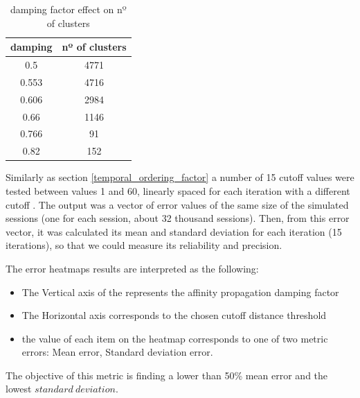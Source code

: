 \documentclass[ecp,tc,english]{iiufrgs}
\begin{document}
        \begin{table}[H]
            \centering
            \begin{small}
                \begin{tabular}{ |c|c| } 
                    \hline
                    damping & nº of clusters \\
                    \hline 
                    0.5 & 4771 \\ 
                    0.553 & 4716 \\ 
                    0.606 & 2984 \\
                    0.66 & 1146 \\
                    0.766 & 91 \\
                    0.82 & 152 \\
                    \hline
                \end{tabular}
                \end{small}
            \caption{damping factor effect on nº of clusters}
            \label{tab:damping_factor}
        \end{table}
        
        Similarly as section \ref{temporal_ordering_factor} a number of 15 cutoff values were tested between values 1 and 60, linearly spaced for each iteration with a different cutoff . The output was a vector of error values of the same size of the simulated sessions (one for each session, about 32 thousand sessions).
        Then, from this error vector, it was calculated its mean and standard deviation for each iteration (15 iterations), so that we could measure its reliability and precision.
        
        The error heatmaps results are interpreted as the following:
        \begin{itemize}
            \item The Vertical axis of the represents the affinity propagation damping factor
            \item The Horizontal axis corresponds to the chosen cutoff distance threshold
            \item the value of each item on the heatmap corresponds to one of two metric errors: Mean error, Standard deviation error.
        \end{itemize}
    
        The objective of this metric is finding a lower than 50\% mean error and the lowest \(standard\ deviation\).
        
\end{document}

